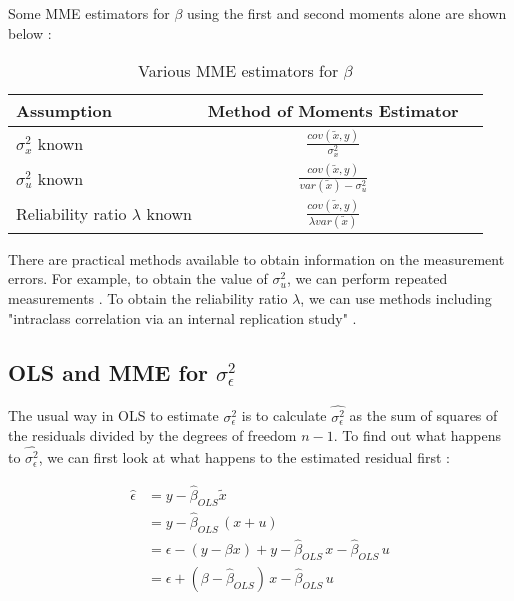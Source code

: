 \documentclass{article}
\begin{document}
Some MME estimators for $\beta$ using the first and second moments alone are shown below \cite{mmereport}:

\begin{table}[ht]
    \centering
    \caption{Various MME estimators for $\beta$}
    \begin{tabular}[t]{lcc}
        \hline
        Assumption&Method of Moments Estimator\\
        \hline
        $\sigma^2_x$ known&$\frac{cov(\tilde{x}, y)}{\sigma^2_x}$\\
        $\sigma^2_u$ known&$\frac{cov(\tilde{x}, y)}{var(\tilde{x}) - \sigma^2_u}$\\
        Reliability ratio $\lambda$ known&$\frac{cov(\tilde{x}, y)}{\lambda var(\tilde{x})}$\\
        \hline
    \end{tabular}
\end{table}%

There are practical methods available to obtain information on the measurement errors. For example, to obtain the value of $\sigma^2_u$, we can perform repeated measurements \cite{mmereport}. To obtain the reliability ratio $\lambda$, we can use methods including "intraclass correlation via an internal replication study" \cite{mmereport}.

\subsection{OLS and MME for $\sigma_\epsilon^2$}

The usual way in OLS to estimate $\sigma_\epsilon^2$ is to calculate $\hat{\sigma^2_\epsilon}$ as the sum of squares of the residuals divided by the degrees of freedom $n-1$.
To find out what happens to $\hat{\sigma^2_\epsilon}$, we can first look at what happens to the estimated residual first \cite{lecturenotes}:

\begin{equation}
    \begin{split}
        \hat{\epsilon}  &= y - \hat{\beta}_{OLS} \tilde{x} \\
                        &= y - \hat{\beta}_{OLS} \, (x+u) \\
                        &= \epsilon - (y - \beta x) + y - \hat{\beta}_{OLS} \, x - \hat{\beta}_{OLS} \, u \\
                        &= \epsilon + (\beta - \hat{\beta}_{OLS}) \, x - \hat{\beta}_{OLS} \, u
    \end{split} 
\end{equation}
\end{document}
